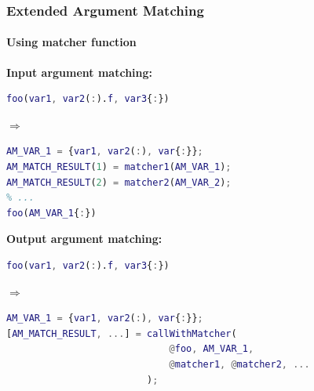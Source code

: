 \documentclass[10pt]{beamer}
\begin{document}
\begin{frame}[fragile]
\frametitle{Extended Argument Matching}
\framesubtitle{Using matcher function}
\textbf{Input argument matching:}
\begin{lstlisting}[basicstyle=\small, language=MATLAB]
foo(var1, var2(:).f, var3{:})
\end{lstlisting} 
$\Rightarrow$
\begin{lstlisting}[basicstyle=\small, language=MATLAB]
AM_VAR_1 = {var1, var2(:), var{:}};
AM_MATCH_RESULT(1) = matcher1(AM_VAR_1);
AM_MATCH_RESULT(2) = matcher2(AM_VAR_2);
% ...
foo(AM_VAR_1{:})
\end{lstlisting}

\textbf{Output argument matching:}
\begin{lstlisting}[basicstyle=\small, language=MATLAB]
foo(var1, var2(:).f, var3{:})
\end{lstlisting} 
$\Rightarrow$
\begin{lstlisting}[basicstyle=\small, language=MATLAB]
% callWithMatcher is a MEX implemented subroutine using C
AM_VAR_1 = {var1, var2(:), var{:}};
[AM_MATCH_RESULT, ...] = callWithMatcher(
                             @foo, AM_VAR_1, 
                             @matcher1, @matcher2, ...
                         );
\end{lstlisting}
\end{frame}



\end{document}
